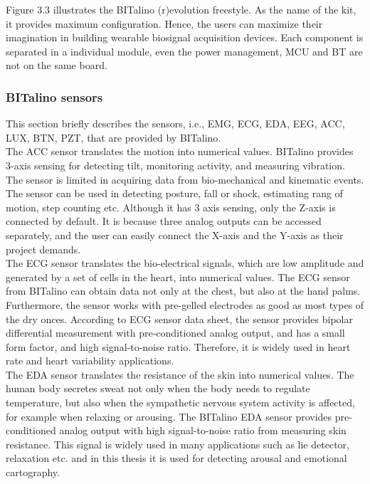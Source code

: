             Figure 3.3 illustrates the BITalino (r)evolution freestyle\citep{BITalino_Freestyle}. As the name of the kit, it provides maximum configuration. Hence, the users can maximize their imagination in building wearable biosignal acquisition devices. Each component is separated in a individual module, even the power management, MCU and BT are not on the same board.\\
        \subsubsection{BITalino sensors}
            This section briefly describes the sensors, i.e., EMG, ECG, EDA, EEG, ACC, LUX, BTN, PZT, that are provided by BITalino.\\
            The ACC sensor translates the motion into numerical values. BITalino provides 3-axis sensing for detecting tilt, monitoring activity, and measuring vibration. The sensor is limited in acquiring data from bio-mechanical and kinematic events. The sensor can be used in detecting posture, fall or shock, estimating rang of motion, step counting etc. Although it has 3 axis sensing, only the Z-axis is connected by default. It is because three analog outputs can be accessed separately, and the user can easily connect the X-axis and the Y-axis as their project demands.\\
            The ECG sensor translates the bio-electrical signals, which are low amplitude and generated by a set of cells in the heart, into numerical values. The ECG sensor from BITalino can obtain data not only at the chest, but also at the hand palms. Furthermore, the sensor works with pre-gelled electrodes as good as most types of the dry onces. According to ECG sensor data sheet, the sensor provides bipolar differential measurement with pre-conditioned analog output, and has a small form factor, and high signal-to-noise ratio. Therefore, it is widely used in heart rate and heart variability applications.\\
            The EDA sensor translates the resistance of the skin into numerical values. The human body secretes sweat not only when the body needs to regulate temperature, but also when the sympathetic nervous system activity is affected, for example when relaxing or arousing. The BITalino EDA sensor provides pre-conditioned analog output with high signal-to-noise ratio from measuring skin resistance. This signal is widely used in many applications such as lie detector, relaxation etc. and in this thesis it is used for detecting arousal and emotional cartography.\\

